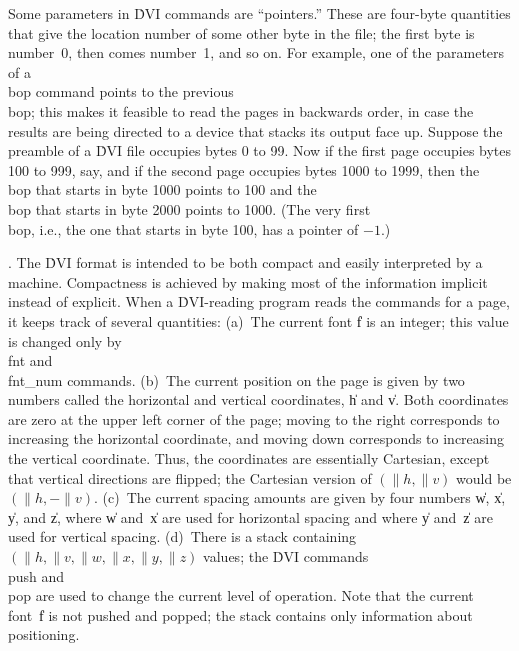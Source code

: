 Some parameters in \.{DVI} commands are ``pointers.'' These are four-byte
quantities that give the location number of some other byte in the file;
the first byte is number~0, then comes number~1, and so on. For example,
one of the parameters of a \\{bop} command points to the previous \\{bop};
this makes it feasible to read the pages in backwards order, in case the
results are being directed to a device that stacks its output face up.
Suppose the preamble of a \.{DVI} file occupies bytes 0 to 99. Now if the
first page occupies bytes 100 to 999, say, and if the second
page occupies bytes 1000 to 1999, then the \\{bop} that starts in byte 1000
points to 100 and the \\{bop} that starts in byte 2000 points to 1000. (The
very first \\{bop}, i.e., the one that starts in byte 100, has a pointer of
$-1$.)

\fi

. The \.{DVI} format is intended to be both compact and easily interpreted
by a machine. Compactness is achieved by making most of the information
implicit instead of explicit. When a \.{DVI}-reading program reads the
commands for a page, it keeps track of several quantities: (a)~The current
font \|f is an integer; this value is changed only
by \\{fnt} and \\{fnt\_num} commands. (b)~The current position on the page
is given by two numbers called the horizontal and vertical coordinates,
\|h and \|v. Both coordinates are zero at the upper left corner of the page;
moving to the right corresponds to increasing the horizontal coordinate, and
moving down corresponds to increasing the vertical coordinate. Thus, the
coordinates are essentially Cartesian, except that vertical directions are
flipped; the Cartesian version of $(\|h,\|v)$ would be $(\|h,-\|v)$.  (c)~The
current spacing amounts are given by four numbers \|w, \|x, \|y, and \|z,
where \|w and~\|x are used for horizontal spacing and where \|y and~\|z
are used for vertical spacing. (d)~There is a stack containing
$(\|h,\|v,\|w,\|x,\|y,\|z)$ values; the \.{DVI} commands \\{push} and \\{pop}
are used to
change the current level of operation. Note that the current font~\|f is
not pushed and popped; the stack contains only information about
positioning.

